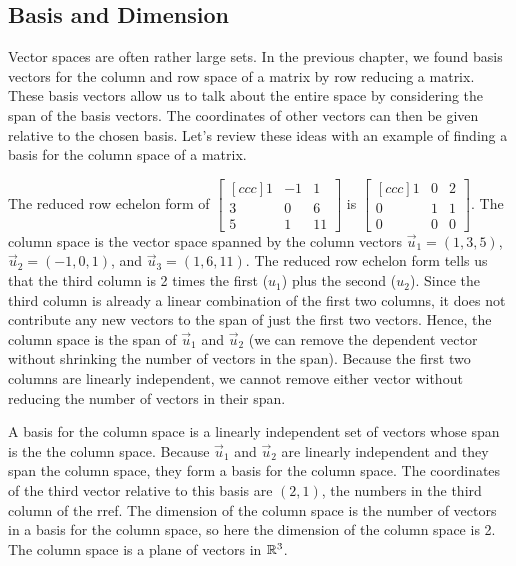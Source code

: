 \subsection{Basis and Dimension}
Vector spaces are often rather large sets. In the previous chapter, we found basis vectors for the column and row space of a matrix by row reducing a matrix. These basis vectors allow us to talk about the entire space by considering the span of the basis vectors. The coordinates of other vectors can then be given relative to the chosen basis. Let's review these ideas with an example of finding a basis for the column space of a matrix.

\begin{example}
The reduced row echelon form of 
$\begin{bmatrix}[ccc] 1&-1&1\\3&0&6\\5&1&11\end{bmatrix}$ 
is 
$\begin{bmatrix}[ccc] 1&0&2\\0&1&1\\0&0&0\end{bmatrix}$. 
The column space is the vector space spanned by the column vectors 
$\vec u_1= (1,3,5)$, 
$\vec u_2= (-1,0,1)$, and 
$\vec u_3= (1,6,11)$.
The reduced row echelon form tells us that the third column is 2 times the first ($u_1$) plus the second ($u_2$).   
Since the third column is already a linear combination of the first two columns, it does not contribute any new vectors to the span of just the first two vectors.  
Hence, the column space is the span of $\vec u_1$ and $\vec u_2$ (we can remove the dependent vector without shrinking the number of vectors in the span). 
Because the first two columns are linearly independent, we cannot remove either vector without reducing the number of vectors in their span.

A basis for the column space is a linearly independent set of vectors whose span is the the column space. 
Because $\vec u_1$ and $\vec u_2$ are linearly independent and they span the column space, they form a basis for the column space. 
The coordinates of the third vector relative to this basis are $(2,1)$, the numbers in the third column of the rref.  
The dimension of the column space is the number of vectors in a basis for the column space, so here the dimension of the column space is 2.  The column space is a plane of vectors in $\mathbb{R}^3$.
\end{example}

